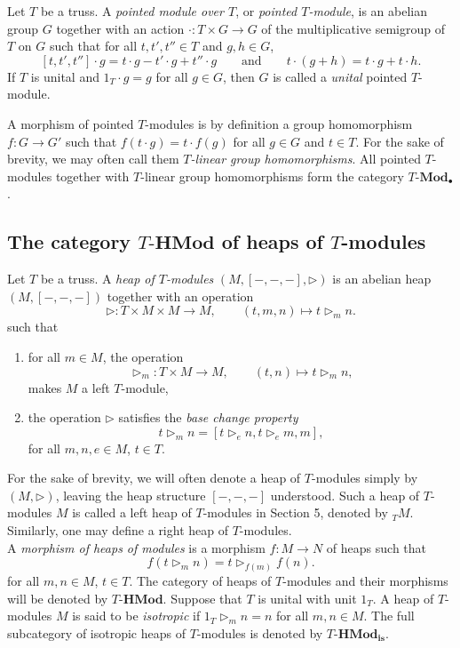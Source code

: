 \documentclass[11pt, twoside]{article}
\begin{document}
\begin{definition}{\rm \cite[Definition 2.7]{mb}}
Let $T$ be a truss. A {\it pointed module over $T$}, or {\it pointed $T$-module}, is an abelian group $G$ together with an action \mbox{$\cdot\colon T\times G\to G$} of the multiplicative semigroup of $T$ on $G$ such that for all $t,t',t''\in T$ and $g,h\in G$,
\begin{equation}\label{eq:TGrp}
[t,t',t'']\cdot g = t\cdot g - t'\cdot g + t''\cdot g \qquad  \text{and} \qquad t\cdot (g+h) = t\cdot g+t\cdot h.
\end{equation}
If $T$ is unital and $1_T \cdot g = g$ for all $g \in G$, then $G$ is called a {\em unital} pointed $T$-module.

A morphism of pointed $T$-modules is by definition a group homomorphism $f \colon  G \to G'$ such that
$f(t \cdot g) = t \cdot f(g)$
for all $g \in G$ and $t \in T$. For the sake of brevity, we may often call them \emph{$T$-linear group homomorphisms}.
All pointed $T$-modules together with $T$-linear group homomorphisms form the category $T\textbf{-Mod}_{\bullet}$.
\end{definition}

\subsection{The category $T\textbf{-HMod}$ of heaps of $T$-modules}
\begin{definition}{\rm \cite[Definition 2.5]{mb}}
Let $T$ be a truss. A \emph{heap of $T$-modules} $(M,[-,-,-],\triangleright)$ is an abelian heap $(M,[-,-,-])$ together with an operation
\[\triangleright : T \times M \times M \to M, \qquad (t,m,n) \mapsto t \triangleright_m n.\]
such that
\begin{enumerate}
\item[(HM1)] for all $m \in M$, the operation
\[\triangleright_m : T \times M \to M, \qquad (t,n) \mapsto t \triangleright_m n,\]
makes $M$ a left $T$-module,
\item[(HM2)] the operation $\triangleright$ satisfies the \emph{base change property}
\[t \triangleright_m n = [ t \triangleright_e n, t \triangleright_e m, m],\]
for all $ m,n,e \in M$, $t \in T$.
\end{enumerate}
 For the sake of brevity, we will often denote a heap of $T$-modules simply by $(M,\triangleright)$, leaving the heap structure $[-,-,-]$ understood. Such a heap of $T$-modules $M$ is called a left heap of $T$-modules in Section 5, denoted by $_{T} M$. Similarly, one may define a right heap of $T$-modules. \\

A \emph{morphism of heaps of modules} is a morphism $f : M \to N$ of heaps such that
$$ f(t \triangleright_m n) = t \triangleright_{f(m)} f(n). $$
for all $m,n \in M$, $t \in T$. The category of heaps of $T$-modules and their morphisms will be denoted by $T\textbf{-HMod}$.
Suppose that $T$ is unital with unit $1_T$. A heap of $T$-modules $M$ is said to be \emph{isotropic} if $1_T \triangleright_m n = n$ for all $m,n \in M$. The full subcategory of isotropic heaps of $T$-modules is denoted by $T\textbf{-HMod}_{\textbf{is}}$.
\end{definition}
\end{document}
